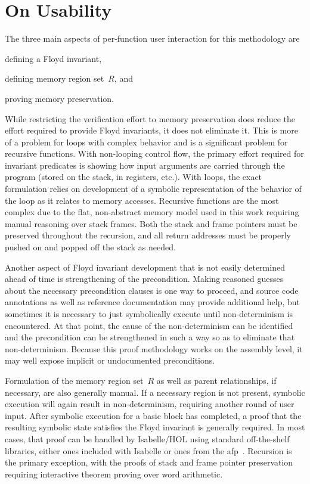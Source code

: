 \section{On Usability}
The three main aspects of per-function user interaction for this methodology are
\begin{enumerate*}
  \item defining a Floyd invariant,
  \item defining memory region set~$R$, and
  \item proving memory preservation.
\end{enumerate*}
While restricting the verification effort to memory preservation
does reduce the effort required to provide Floyd invariants, it does not eliminate it.
This is more of a problem for loops with complex behavior
and is a significant problem for recursive functions.
With non-looping control flow,
the primary effort required for invariant predicates is showing how input arguments
are carried through the program (stored on the stack, in registers, etc.).
With loops, the exact formulation relies on development of a symbolic representation
of the behavior of the loop as it relates to memory accesses.
Recursive functions are the most complex
due to the flat, non-abstract memory model used in this work
requiring manual reasoning over stack frames.
Both the stack and frame pointers must be preserved throughout the recursion,
and all return addresses must be properly pushed on and popped off the stack as needed.

Another aspect of Floyd invariant development
that is not easily determined ahead of time is strengthening of the precondition.
Making reasoned guesses about the necessary precondition clauses is one way to proceed,
and source code annotations as well as reference documentation
may provide additional help,
but sometimes it is necessary to just symbolically execute
until non-determinism is encountered.
At that point, the cause of the non-determinism can be identified
and the precondition can be strengthened in such a way so as to eliminate
that non-determinism.
Because this proof methodology works on the assembly level,
it may well expose implicit or undocumented preconditions.

Formulation of the memory region set~$R$ as well as parent relationships,
if necessary,
are also generally manual.
If a necessary region is not present,
symbolic execution will again result in non-determinism,
requiring another round of user input.
After symbolic execution for a basic block has completed,
a proof that the resulting symbolic state satisfies the Floyd invariant
is generally required.
In most cases, that proof can be handled by Isabelle/HOL
using standard off-the-shelf libraries,
either ones included with Isabelle or ones from the \ac{afp}~\citep{afp}.
Recursion is the primary exception,
with the proofs of stack and frame pointer preservation
requiring interactive theorem proving over word arithmetic.

